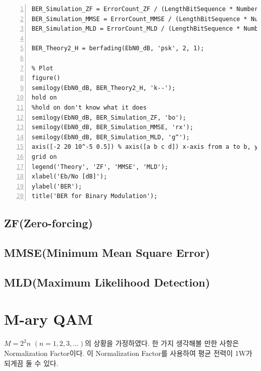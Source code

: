 \documentclass{article}
\begin{document}
\begin{lstlisting}[style=Matlab-editor,
frame=single,
numbers=left,]
BER_Simulation_ZF = ErrorCount_ZF / (LengthBitSequence * NumberIteration);
BER_Simulation_MMSE = ErrorCount_MMSE / (LengthBitSequence * NumberIteration);
BER_Simulation_MLD = ErrorCount_MLD / (LengthBitSequence * NumberIteration);

BER_Theory2_H = berfading(EbN0_dB, 'psk', 2, 1);

% Plot
figure()
semilogy(EbN0_dB, BER_Theory2_H, 'k--');
hold on
%hold on don't know what it does
semilogy(EbN0_dB, BER_Simulation_ZF, 'bo');
semilogy(EbN0_dB, BER_Simulation_MMSE, 'rx');
semilogy(EbN0_dB, BER_Simulation_MLD, 'g^');
axis([-2 20 10^-5 0.5]) % axis([a b c d]) x-axis from a to b, y-axis from c to d
grid on
legend('Theory', 'ZF', 'MMSE', 'MLD');
xlabel('Eb/No [dB]');
ylabel('BER');
title('BER for Binary Modulation');
\end{lstlisting}
\subsection{ZF(Zero-forcing)}
\subsection{MMSE(Minimum Mean Square Error)}
\subsection{MLD(Maximum Likelihood Detection)}
\section{M-ary QAM}
$M=2^2n$ $(n=1,2,3,...)$의 상황을 가정하였다.
한 가지 생각해볼 만한 사항은 Normalization Factor이다. 이 Normalization Factor를 사용하여 평균 전력이 1W가 되게끔 둘 수 있다.
\end{document}
